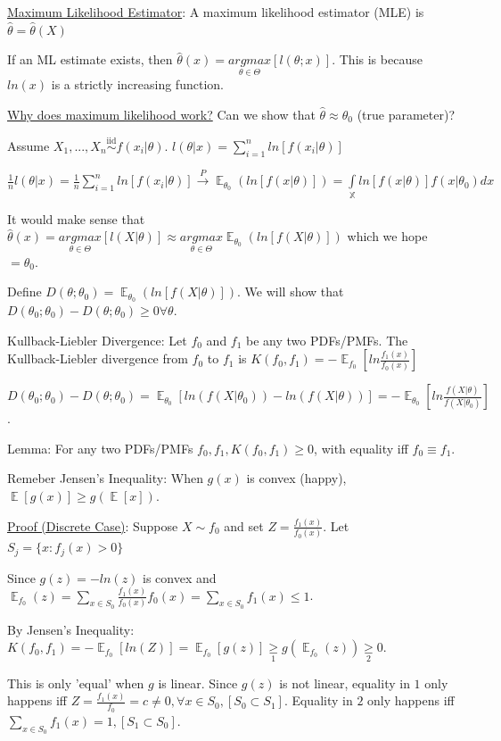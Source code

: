 \documentclass{article}
\DeclareMathOperator{\EX}{\mathbb{E}} %
\newcommand{\pto}{\overset{P}{\to}}
\let\Oldint=\int
\let\Oldsum=\sum
\renewcommand{\int}{\Oldint\limits}
\renewcommand{\sum}{\Oldsum\limits}
\newcommand{\iiddist}{\overset{\mathrm{iid}}{\sim}}
\begin{document}
\underline{Maximum Likelihood Estimator}: A maximum likelihood estimator (MLE) is $\hat{\theta} = \hat{\theta}(X)$

If an ML estimate exists, then $\hat{\theta}(x) = \underset{\theta \in \Theta}{argmax} [l(\theta;x)]$. This is because $ln(x)$ is a strictly increasing function.


\underline{Why does maximum likelihood work?} Can we show that $\hat{\theta} \approx \theta_0$ (true parameter)?

Assume $X_1, ..., X_n \iiddist f(x_i|\theta)$. $l(\theta | x) = \sum_{i=1}^n ln[f(x_i|\theta)]$

$\frac{1}{n} l(\theta | x) = \frac{1}{n}\sum_{i=1}^n ln[f(x_i | \theta)] \pto \EX_{\theta_0}(ln[f(x|\theta)]) = \int_{\mathbb{X}} ln[f(x|\theta)]f(x|\theta_0)dx$

It would make sense that $\hat{\theta}(x) = \underset{\theta \in \Theta}{argmax}[l(X|\theta)] \approx \underset{\theta \in \Theta}{argmax}\EX_{\theta_0}(ln[f(X|\theta)])$ which we hope $= \theta_0$.

Define $D(\theta;\theta_0) = \EX_{\theta_0}(ln[f(X|\theta)])$. We will show that $D(\theta_0;\theta_0) - D(\theta;\theta_0) \ge 0 \forall \theta$.

Kullback-Liebler Divergence: Let $f_0$ and $f_1$ be any two PDFs/PMFs. The Kullback-Liebler divergence from $f_0$ to $f_1$ is $K(f_0, f_1) = -\EX_{f_0}[ln\frac{f_1(x)}{f_0(x)}]$

$D(\theta_0;\theta_0) - D(\theta;\theta_0) = \EX_{\theta_0}[ln(f(X|\theta_0)) - ln(f(X|\theta))] = -\EX_{\theta_0}[ln\frac{f(X|\theta)}{f(X|\theta_0)}]$.

Lemma: For any two PDFs/PMFs $f_0, f_1, K(f_0, f_1) \ge 0$, with equality iff $f_0 \equiv f_1$.

Remeber Jensen's Inequality: When $g(x)$ is convex (happy), $\EX[g(x)] \ge g(\EX[x])$.

\underline{Proof (Discrete Case)}: Suppose $X \sim f_0$ and set $Z = \frac{f_1(x)}{f_0(x)}$. Let $S_j = \{x: f_j(x) > 0\}$

Since $g(z) = - ln(z)$ is convex and $\EX_{f_0}(z) = \sum_{x \in S_0} \frac{f_1(x)}{f_0(x)}f_0(x) = \sum_{x \in S_0} f_1(x) \le 1$.

By Jensen's Inequality: $K(f_0,f_1) = -\EX_{f_0}[ln(Z)] = \EX_{f_0}[g(z)] \underset{1}{\ge} g(\EX_{f_0}(z)) \underset{2}{\ge} 0$. 

This is only 'equal' when $g$ is linear. Since $g(z)$ is not linear, equality in $1$ only happens iff $Z = \frac{f_1(x)}{f_0} = c \ne 0, \forall x \in S_0, [S_0 \subset S_1]$. Equality in $2$ only happens iff $\sum_{x \in S_0} f_1(x) = 1, [S_1 \subset S_0]$. 
\end{document}
